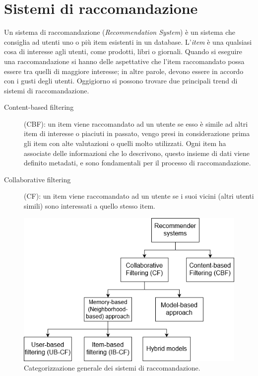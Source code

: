 \section{Sistemi di raccomandazione}
Un sistema di raccomandazione (\textit{Recommendation System}) è un sistema che consiglia ad utenti uno o più item esistenti 
in un database. L'\textit{item} è una qualsiasi cosa di interesse agli utenti, come prodotti, libri o giornali. Quando si eseguire 
una raccomandazione si hanno delle aspettative che l'item raccomandato possa essere tra quelli di maggiore interesse; in altre parole, 
devono essere in accordo con i gusti degli utenti.\hfill\break
Oggigiorno si possono trovare due principali trend di sistemi di raccomandazione.
\begin{description}
    \item[Content-based filtering](CBF): un item viene raccomandato ad un utente se esso è simile ad altri item di interesse o piaciuti 
    in passato, vengo presi in considerazione prima gli item con alte valutazioni o quelli molto utilizzati. Ogni item ha associate 
    delle informazioni che lo descrivono, questo insieme di dati viene definito metadati, e sono fondamentali per il processo di 
    raccomandazione.
    \item[Collaborative filtering](CF): un item viene raccomandato ad un utente se i suoi vicini (altri utenti simili) sono 
    interessati a quello stesso item.
\end{description}
%
\begin{figure}[ht!]
    \centering
    \includegraphics[scale=0.5]{images/recommender_systems.png}
    \caption{Categorizzazione generale dei sistemi di raccomandazione.}
    \label{fig:recommender_systems}
\end{figure}
